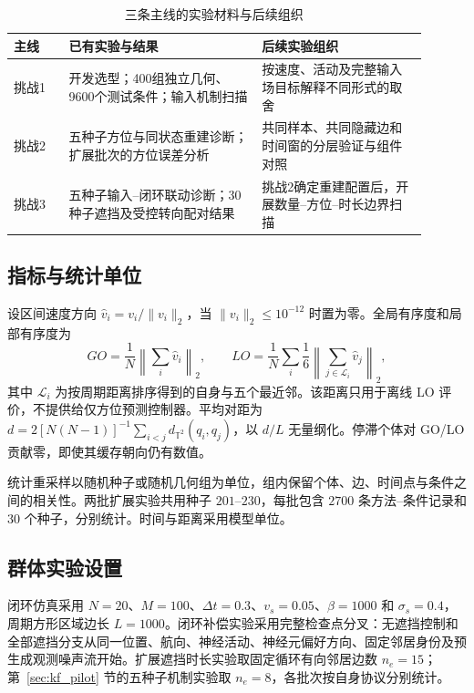 \documentclass[UTF8,fontset=windows,11pt]{ctexart}
\begin{document}
\begin{table}[!htbp]
\centering\small
\caption{三条主线的实验材料与后续组织}
\label{tab:experiment_progress}
\begin{tabular}{>{\raggedright\arraybackslash}p{0.12\linewidth}
                >{\raggedright\arraybackslash}p{0.42\linewidth}
                >{\raggedright\arraybackslash}p{0.36\linewidth}}
\toprule
主线 & 已有实验与结果 & 后续实验组织\\
\midrule
挑战1 & 开发选型；400组独立几何、9600个测试条件；输入机制扫描 & 按速度、活动及完整输入场目标解释不同形式的取舍\\[3pt]
挑战2 & 五种子方位与同状态重建诊断；扩展批次的方位误差分析 & 共同样本、共同隐藏边和时间窗的分层验证与组件对照\\[3pt]
挑战3 & 五种子输入--闭环联动诊断；30种子遮挡及受控转向配对结果 & 挑战2确定重建配置后，开展数量--方位--时长边界扫描\\
\bottomrule
\end{tabular}
\end{table}

\subsection{指标与统计单位}
设区间速度方向 $\widehat v_i=v_i/\|v_i\|_2$，当 $\|v_i\|_2\le10^{-12}$ 时置为零。全局有序度和局部有序度为
\begin{equation}
GO=\frac1N\left\|\sum_i\widehat v_i\right\|_2,\qquad
LO=\frac1N\sum_i\frac1{6}\left\|\sum_{j\in\mathcal L_i}\widehat v_j\right\|_2,
\end{equation}
其中 $\mathcal L_i$ 为按周期距离排序得到的自身与五个最近邻。该距离只用于离线 LO 评价，不提供给仅方位预测控制器。平均对距为 $d=2[N(N-1)]^{-1}\sum_{i<j}d_{\mathbb T^2}(q_i,q_j)$，以 $d/L$ 无量纲化。停滞个体对 GO/LO 贡献零，即使其缓存朝向仍有数值。

统计重采样以随机种子或随机几何组为单位，组内保留个体、边、时间点与条件之间的相关性。两批扩展实验共用种子 $201$--$230$，每批包含 $2700$ 条方法--条件记录和 $30$ 个种子，分别统计。时间与距离采用模型单位。

\subsection{群体实验设置}

闭环仿真采用 $N=20$、$M=100$、$\Delta t=0.3$、$v_s=0.05$、$\beta=1000$ 和 $\sigma_s=0.4$，周期方形区域边长 $L=1000$。闭环补偿实验采用完整检查点分叉：无遮挡控制和全部遮挡分支从同一位置、航向、神经活动、神经元偏好方向、固定邻居身份及预生成观测噪声流开始。扩展遮挡时长实验取固定循环有向邻居边数 $n_e=15$；第~\ref{sec:kf_pilot} 节的五种子机制实验取 $n_e=8$，各批次按自身协议分别统计。
\end{document}
